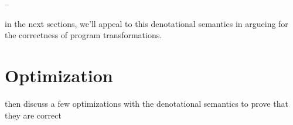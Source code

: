 



--

in the next sections, we'll appeal to this denotational semantics in
argueing for the correctness of program transformations.

\section{Optimization}

then discuss a few optimizations with the denotational semantics to
prove that they are correct

